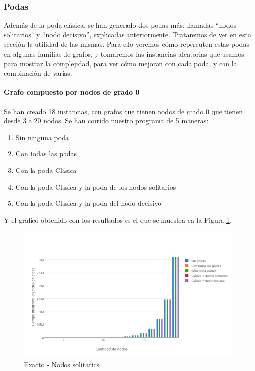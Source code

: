 
\subsubsection{Podas}

Además de la poda clásica, se han generado dos podas más, llamadas ``nodos solitarios'' y ``nodo decisivo'', explicadas anteriormente. Trataremos de ver en esta sección la utilidad de las mismas. Para ello veremos cómo repercuten estas podas en algunas familias de grafos, y tomaremos las instancias aleatorias que usamos para mostrar la complejidad, para ver cómo mejoran con cada poda, y con la combinación de varias.

\paragraph{Grafo compuesto por nodos de grado 0}

Se han creado 18 instancias, con grafos que tienen nodos de grado 0 que tienen desde 3 a 20 nodos. Se han corrido nuestro programa de 5 maneras:

\begin{enumerate}
	\item Sin ninguna poda
	\item Con todas las podas 
	\item Con la poda Clásica
	\item Con la poda Clásica y la poda de los nodos solitarios
	\item Con la poda Clásica y la poda del nodo decisivo
\end{enumerate}

Y el gráfico obtenido con los resultados es el que se muestra en la Figura \ref{fig:1C}.

\begin{figure}[htb]
	\begin{center}
    		\includegraphics[scale=0.8]{imagenes/exacto-solitarios.png}
	\end{center}
	\caption{Exacto - Nodos solitarios}\label{fig:1C}
\end{figure}

